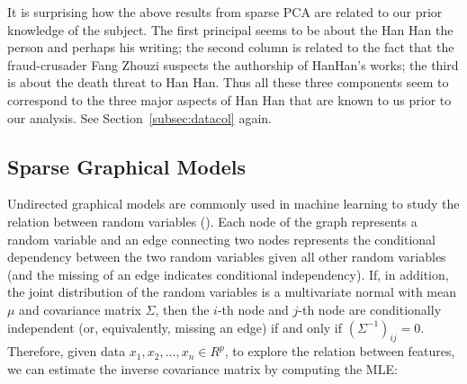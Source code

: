 \documentclass[11pt]{article}
\newcommand{\1}[1]{{\mathbf 1}\left\{#1\right\}}        %
\begin{document}
It is surprising how the above results from sparse PCA are related to our prior knowledge of the subject. The first principal seems to be about the Han Han the person and perhaps his writing; the second column is related to the fact that the fraud-crusader Fang Zhouzi suspects the authorship of HanHan's works; the third is about the death threat to Han Han. Thus all these three components seem to correspond to the three major aspects of Han Han that are known to us prior to our analysis. See Section~\ref{subsec:datacol} again.




\subsection{Sparse Graphical Models}

Undirected graphical models are commonly used in machine learning to study the relation between random variables (\cite{wainwright2008graphical}). Each node of the graph represents a random variable and an edge connecting two nodes represents the conditional dependency between the two random variables given all other random variables (and the missing of an edge indicates conditional independency). If, in addition, the joint distribution of the random variables is a multivariate normal with mean $\mu$ and covariance matrix $\Sigma$, then the $i$-th node and $j$-th node are conditionally independent (or, equivalently, missing an edge) if and only if $(\Sigma^{-1})_{ij} = 0$. Therefore, given data $x_1,x_2,...,x_n\in R^p$, to explore the relation between features, we can estimate the inverse covariance matrix by computing the MLE:   
\end{document}
